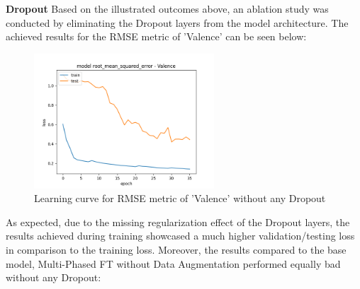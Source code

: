 \textbf{Dropout}\newline
Based on the illustrated outcomes above, an ablation study was conducted by eliminating the Dropout layers from the model architecture. The achieved results for the RMSE metric of 'Valence' can be seen below:

\begin{figure}[H]
  \begin{center}
  \includegraphics[angle=0, width=0.6\textwidth]{Figures/rmse_out1_noDropout.png}
  \caption{Learning curve for RMSE metric of 'Valence' without any Dropout}
  \label{fig:AblationNoDropout}
  \end{center}
\end{figure}

As expected, due to the missing regularization effect of the Dropout layers, the results achieved during training showcased a much higher validation/testing loss in comparison to the training loss. Moreover, the results compared to the base model, Multi-Phased FT without Data Augmentation performed equally bad without any Dropout:

